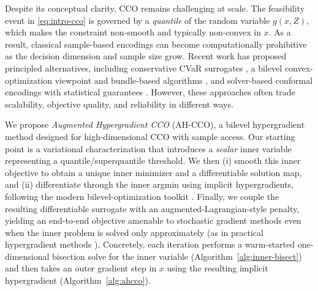 \documentclass{uai2026} %
\theoremstyle{plain}
\theoremstyle{definition}
\begin{document}
Despite its conceptual clarity, CCO remains challenging at scale.
The feasibility event in \eqref{eq:intro-cco} is governed by a \emph{quantile} of the random variable $g(x,Z)$, which makes the constraint non-smooth and typically non-convex in $x$.
As a result, classical sample-based encodings can become computationally prohibitive as the decision dimension and sample size grow.
Recent work has proposed principled alternatives, including conservative CVaR surrogates \citep{rockafellaruryasev2000cvar}, a bilevel convex-optimization viewpoint and bundle-based algorithms \citep{laguelmalickackooij2021bilevel}, and solver-based conformal encodings with statistical guarantees \citep{zhao2024conformal}.
However, these approaches often trade scalability, objective quality, and reliability in different ways.

We propose \emph{Augmented Hypergradient CCO} (AH-CCO), a bilevel hypergradient method designed for high-dimensional CCO with sample access.
Our starting point is a variational characterization that introduces a \emph{scalar} inner variable representing a quantile/superquantile threshold.
We then (i) smooth this inner objective to obtain a unique inner minimizer and a differentiable solution map, and (ii) differentiate through the inner argmin using implicit hypergradients, following the modern bilevel-optimization toolkit \citep{pedregosa2016hyperparameter,franceschi2018bilevel,ji2021bilevel}.
Finally, we couple the resulting differentiable surrogate with an augmented-Lagrangian-style penalty, yielding an end-to-end objective amenable to stochastic gradient methods even when the inner problem is solved only approximately (as in practical hypergradient methods \citep{chen2024finding}).
Concretely, each iteration performs a warm-started one-dimensional bisection solve for the inner variable (Algorithm~\ref{alg:inner-bisect}) and then takes an outer gradient step in $x$ using the resulting implicit hypergradient (Algorithm~\ref{alg:ahcco}).
\end{document}
